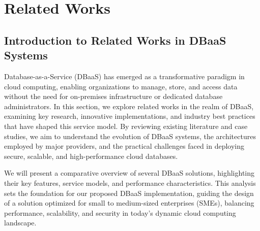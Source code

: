 \section{Related Works}

\subsection{Introduction to Related Works in DBaaS Systems}
Database-as-a-Service (DBaaS) has emerged as a transformative paradigm in cloud computing, enabling organizations to manage, store, and access data without the need for on-premises infrastructure or dedicated database administrators. In this section, we explore related works in the realm of DBaaS, examining key research, innovative implementations, and industry best practices that have shaped this service model. By reviewing existing literature and case studies, we aim to understand the evolution of DBaaS systems, the architectures employed by major providers, and the practical challenges faced in deploying secure, scalable, and high-performance cloud databases.

We will present a comparative overview of several DBaaS solutions, highlighting their key features, service models, and performance characteristics. This analysis sets the foundation for our proposed DBaaS implementation, guiding the design of a solution optimized for small to medium-sized enterprises (SMEs), balancing performance, scalability, and security in today’s dynamic cloud computing landscape.


